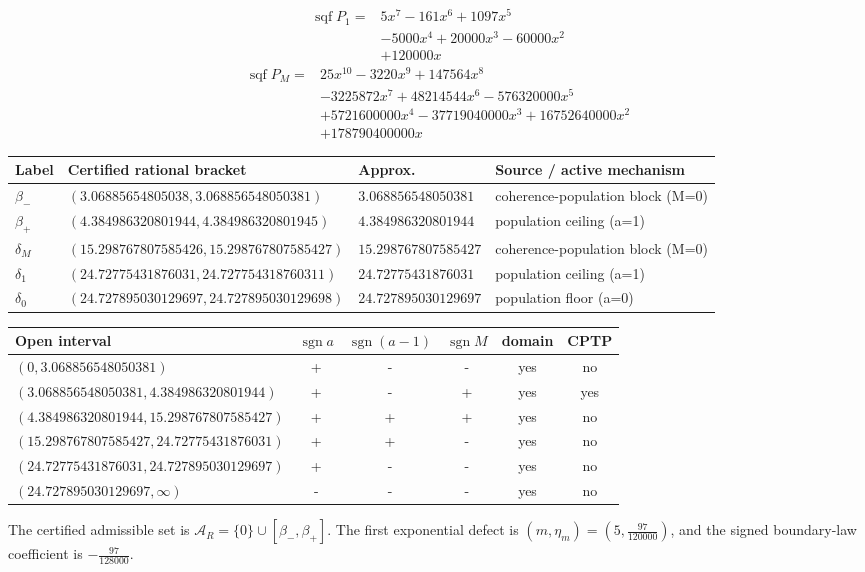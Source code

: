 \[\begin{aligned}
\operatorname{sqf}P_1={}&5 x^{7}-161 x^{6}+1097 x^{5}\\
&-5000 x^{4}+20000 x^{3}-60000 x^{2}\\
&+120000 x
\end{aligned}\]
\[\begin{aligned}
\operatorname{sqf}P_M={}&25 x^{10}-3220 x^{9}+147564 x^{8}\\
&-3225872 x^{7}+48214544 x^{6}-576320000 x^{5}\\
&+5721600000 x^{4}-37719040000 x^{3}+16752640000 x^{2}\\
&+178790400000 x
\end{aligned}\]
\begin{center}
\begin{tabularx}{\textwidth}{@{}l l l X@{}}
\toprule
Label & Certified rational bracket & Approx. & Source / active mechanism \\
\midrule
$\beta_-$ & $(3.06885654805038,3.068856548050381)$ & $3.068856548050381$ & coherence-population block (M=0) \\
$\beta_+$ & $(4.384986320801944,4.384986320801945)$ & $4.384986320801944$ & population ceiling (a=1) \\
$\delta_M$ & $(15.298767807585426,15.298767807585427)$ & $15.298767807585427$ & coherence-population block (M=0) \\
$\delta_1$ & $(24.72775431876031,24.727754318760311)$ & $24.72775431876031$ & population ceiling (a=1) \\
$\delta_0$ & $(24.727895030129697,24.727895030129698)$ & $24.727895030129697$ & population floor (a=0) \\
\bottomrule
\end{tabularx}
\end{center}
\begin{center}
\begin{tabular}{@{}l c c c c c@{}}
\toprule
Open interval & $\operatorname{sgn}a$ & $\operatorname{sgn}(a-1)$ & $\operatorname{sgn}M$ & domain & CPTP \\
\midrule
$(0,3.068856548050381)$ & + & - & - & yes & no \\
$(3.068856548050381,4.384986320801944)$ & + & - & + & yes & yes \\
$(4.384986320801944,15.298767807585427)$ & + & + & + & yes & no \\
$(15.298767807585427,24.72775431876031)$ & + & + & - & yes & no \\
$(24.72775431876031,24.727895030129697)$ & + & - & - & yes & no \\
$(24.727895030129697,\infty)$ & - & - & - & yes & no \\
\bottomrule
\end{tabular}
\end{center}
The certified admissible set is $\mathcal A_R=\{0\}\cup[\beta_-,\beta_+]$. The first exponential defect is $(m,\eta_m)=(5,\frac{97}{120000})$, and the signed boundary-law coefficient is $- \frac{97}{128000}$.
